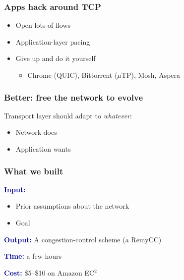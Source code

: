 \documentclass[svgnames]{beamer}
\newcommand{\ssline}{\vspace{8 pt}}
\begin{document}
\begin{frame}
\frametitle{Apps hack around TCP}

\Large

\begin{itemize}
\item Open lots of flows
\item Application-layer pacing
\item Give up and do it yourself

\begin{itemize}
\item Chrome (QUIC), Bittorrent ($\mu$TP), Mosh, Aspera
\end{itemize}

\end{itemize}

\end{frame}

\begin{frame}
\frametitle{Better: free the network to evolve}

\Large Transport layer should adapt to \emph{whatever}:

\begin{itemize}
\item Network does

\item Application wants

\end{itemize}

\end{frame}

\begin{frame}
\frametitle{What we built}

\begin{centering}

\end{centering}

\ssline
\ssline

\textcolor{DarkBlue}{\bf Input:}

\begin{itemize}
\item Prior assumptions about the network

\item Goal
\end{itemize}

\textcolor{DarkBlue}{\bf Output:} A congestion-control scheme (a RemyCC)

\ssline

\textcolor{DarkBlue}{\bf Time:} a few hours

\ssline

\textcolor{DarkBlue}{\bf Cost:} \$5--\$10 on Amazon EC$^2$

\end{frame}
\end{document}
